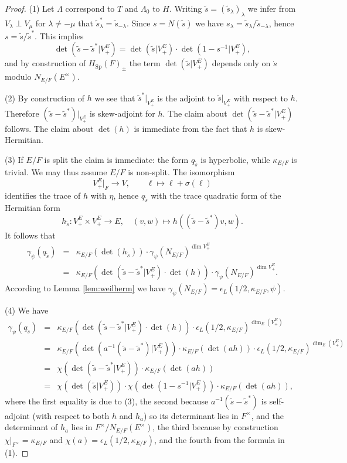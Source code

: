 \documentclass{article}
\DeclareMathOperator{\Sp}{Sp}
\theoremstyle{definition}
\numberwithin{equation}{subsection}
\renewcommand{\-}{\hyp{}}
\begin{document}
\begin{proof}
	(1) Let $\Lambda$ correspond to $T$ and $\Lambda_0$ to $H$. Writing $\tilde s = (\tilde s_\lambda)_\lambda$ we infer from $V_\lambda \perp V_\mu$ for $\lambda \neq -\mu$ that $\tilde s^*_\lambda=\tilde s_{-\lambda}$. Since $s=N(\tilde s)$ we have $s_\lambda=\tilde s_\lambda/\tilde s_{-\lambda}$, hence $s=\tilde s/\tilde s^*$. This implies 
	\[ \det(\tilde s-\tilde s^*|V_+^E) = \det(\tilde s|V_+^E) \cdot \det(1-s^{-1}|V_+^E), \]
	and by construction of $H_{\Sp}(F)_\pm$ the term $\det(\tilde s|V_+^E)$ depends only on $\dot s$ modulo $N_{E/F}(E^\times)$.

	(2) By construction of $h$ we see that $\tilde s^*|_{V_+^E}$ is the adjoint to $\tilde s|_{V_+^E}$ with respect to $h$. Therefore $(\tilde s - \tilde s^*)|_{V_+^E}$ is skew-adjoint for $h$. The claim about $\det(\tilde s - \tilde s^*|V_+^E)$ follows. The claim about $\det(h)$ is immediate from the fact that $h$ is skew-Hermitian.

	(3) If $E/F$ is split the claim is immediate: the form $q_{\tilde s}$ is hyperbolic, while $\kappa_{E/F}$ is trivial. We may thus assume $E/F$ is non-split. The isomorphism 
	\[ V_+^E|_F \to V,\qquad \ell \mapsto \ell+\sigma(\ell) \]
	identifies the trace of $h$ with $\eta$, hence $q_{\tilde s}$ with the trace quadratic form of the Hermitian form 
	\[ h_{\tilde s} : V_+^E \times V_+^E \to E, \quad (v,w) \mapsto h((\tilde s-\tilde s^*)v,w). \]
	It follows that 
	\begin{eqnarray*}
		\gamma_\psi(q_{\tilde s})&=&\kappa_{E/F}(\det(h_{\tilde s}))\cdot \gamma_\psi(N_{E/F})^{\dim V_+^E}\\
		&=&\kappa_{E/F}(\det(\tilde s-\tilde s^*|V_+^E) \cdot \det(h)) \cdot \gamma_\psi(N_{E/F})^{\dim V_+^E}.
	\end{eqnarray*}
	According to Lemma \ref{lem:weilherm} we have $\gamma_\psi(N_{E/F})=\epsilon_L(1/2,\kappa_{E/F},\psi)$.

	(4) We have
	\begin{eqnarray*}
	\gamma_\psi(q_{\dot s})&=&\kappa_{E/F}(\det(\tilde s-\tilde s^*|V_+^E) \cdot \det(h)) \cdot \epsilon_L(1/2,\kappa_{E/F})^{\dim_E(V_+^E)}\\
	&=&\kappa_{E/F}(\det(a^{-1}(\tilde s-\tilde s^*)|V_+^E))\cdot \kappa_{E/F}(\det(ah)) \cdot \epsilon_L(1/2,\kappa_{E/F})^{\dim_E(V_+^E)}\\
	&=&\chi(\det(\tilde s-\tilde s^*|V_+^E))\cdot \kappa_{E/F}(\det(ah))\\
	&=&\chi(\det(\tilde s|V_+^E))\cdot \chi(\det(1-s^{-1}|V_+^E))\cdot \kappa_{E/F}(\det(ah)),
	\end{eqnarray*}
	where the first equality is due to (3), the second because $a^{-1}(\tilde s-\tilde s^*)$ is self-adjoint (with respect to both $h$ and $h_a$) so its determinant lies in $F^\times$, and the determinant of $h_a$ lies in $F^\times/N_{E/F}(E^\times)$, the third because by construction $\chi|_{F^\times}=\kappa_{E/F}$ and $\chi(a)=\epsilon_L(1/2,\kappa_{E/F})$, and the fourth from the formula in (1).
\end{proof}
\end{document}
